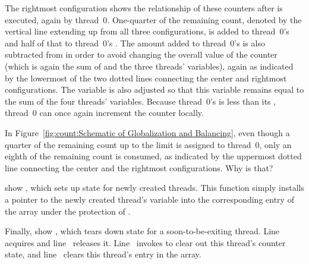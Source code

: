 The rightmost configuration shows the relationship of these counters
after  is executed, again by thread~0.
One-quarter of the remaining count, denoted by the vertical line extending
up from all three configurations, is added to thread~0's
 and half of that to thread~0's .
The amount added to thread~0's  is also subtracted from
 in order to avoid changing the overall value of the
counter (which is again the sum of  and the three
threads'  variables), again as indicated by the lowermost
of the two dotted lines connecting the center and rightmost configurations.
The  variable is also adjusted so that this variable
remains equal to the sum of the four threads' 
variables.
Because thread~0's  is less than its ,
thread~0 can once again increment the counter locally.

\QuickQuiz{}
	In Figure~\ref{fig:count:Schematic of Globalization and Balancing},
	even though a quarter of the remaining count up to the limit is
	assigned to thread~0, only an eighth of the remaining count is
	consumed, as indicated by the uppermost dotted line connecting
	the center and the rightmost configurations.
	Why is that?
 \QuickQuizEnd

\begin{lineref}
 show ,
which sets up state for
newly created threads.
This function simply installs
a pointer to the newly created thread's  variable into
the corresponding entry of the  array under the protection
of .
\end{lineref}

\begin{lineref}
Finally,  show ,
which tears down
state for a soon-to-be-exiting thread.
Line~ acquires  and
line~ releases it.
Line~ invokes 
to clear out this thread's
counter state, and line~ clears this thread's entry in the
 array.
\end{lineref}

